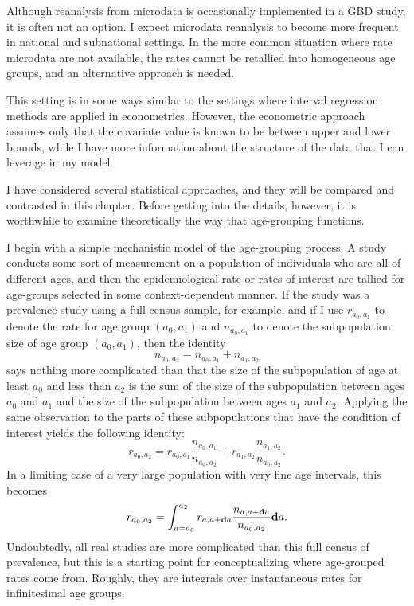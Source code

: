 Although reanalysis from microdata is occasionally implemented in a GBD study,
it is often not an option.  I expect microdata
reanalysis to become more frequent in national and subnational
settings.  In the more common situation where rate microdata are not
available, the rates cannot be retallied into homogeneous age groups,
and an alternative approach is needed.

This setting is in some ways similar to the settings where interval
regression methods are applied in
econometrics.\cite{amemiya_regression_1973,manski_inference_2002,cook_partially_2012}
However, the econometric approach assumes only that the covariate
value is known to be between upper and lower bounds, while I have more
information about the structure of the data that I can leverage in my
model.

I have considered several statistical approaches, and
they will be compared and contrasted in this chapter.  Before getting
into the details, however, it is worthwhile to examine theoretically
the way that age-grouping functions.

I begin with a simple mechanistic model of the age-grouping process.
A study conducts some sort of measurement on a population of
individuals who are all of different ages, and then the
epidemiological rate or rates of interest are tallied for age-groups
selected in some context-dependent manner. If the study was a
prevalence study using a full census sample, for example, and if I use
$r_{a_0,a_1}$ to denote the rate for age group $(a_0, a_1)$ and
$n_{a_0,a_1}$ to denote the subpopulation size of age group
$(a_0,a_1)$, then the identity
\[
n_{a_0, a_2} = n_{a_0,a_1} + n_{a_1,a_2}
\]
says nothing more complicated than that the size of the subpopulation
of age at least $a_0$ and less than $a_2$ is the sum of the size of
the subpopulation between ages $a_0$ and $a_1$ and the size of the
subpopulation between ages $a_1$ and $a_2$.  Applying the same
observation to the parts of these subpopulations that have the condition
of interest yields the following identity:
\[
r_{a_0,a_2} = r_{a_0,a_1}\frac{n_{a_0,a_1}}{n_{a_0,a_2}} + r_{a_1,a_2}\frac{n_{a_1,a_2}}{n_{a_0,a_2}}.
\]
In a limiting case of a very large population with very fine age
intervals, this becomes
\[
r_{a_0,a_2} = \int_{a=a_0}^{a_2} r_{a,a+\mathbf{d} a}\frac{n_{a,a+\mathbf{d} a}}{n_{a_0,a_2}}\mathbf{d} a.
\]
Undoubtedly, all real studies are more complicated than this full
census of prevalence, but this is a starting point for conceptualizing
where age-grouped rates come from.  Roughly, they are integrals over
instantaneous rates for infinitesimal age groups.

